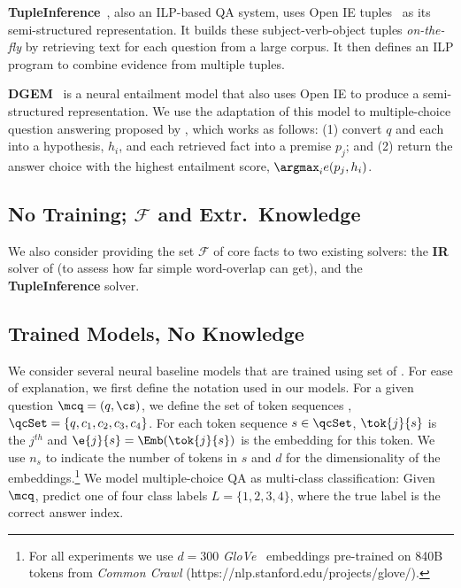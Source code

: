 \textbf{TupleInference}~\cite{Khot2017AnsweringCQ}, also an ILP-based QA system, uses Open IE tuples~\cite{Banko2007OpenIE} as its semi-structured representation. It builds these subject-verb-object tuples \emph{on-the-fly} by retrieving text for each question from a large corpus. It then defines an ILP program to combine evidence from multiple tuples.

\textbf{DGEM}~\cite{Khot2018Scitail} is a neural entailment model that also uses Open IE to produce a semi-structured representation. We use the adaptation of this model to multiple-choice question answering proposed by \citet{ARCClark2018}, which works as follows: (1) convert $q$ and each \ci into a hypothesis, $h_i$, and each retrieved fact into a premise $p_j$; and (2) return the answer choice with the highest entailment score, $\argmax_i e(p_j, h_i)$.

\subsection{No Training; $\mathcal{F}$ and Extr.~Knowledge}
\label{subsec:existing-with-core-facts}

We also consider providing the set $\mathcal{F}$ of core facts to two existing solvers: the \textbf{IR} solver of \citet{clark2016combining} (to assess how far simple word-overlap can get), and the \textbf{TupleInference} solver.

\subsection{Trained Models, No Knowledge}
\label{subsec:neural-no-external}

We consider several neural baseline models that are trained using \trainname set of \obqa. For ease of explanation, we first define the notation used in our models. For a given question $\mcq = (q, \cs)$, we define the set of token sequences , $\qcSet = \{q, c_1, c_2, c_3, c_4\}$. For each token sequence $s \in \qcSet$, $\tok{j}{s}$ is the $j^{th}$ and $\e{j}{s} = \Emb(\tok{j}{s})$ is the embedding for this token. We use $n_s$ to indicate the number of tokens in $s$ and $d$ for the dimensionality of the embeddings.\footnote{For all experiments we use $d=300$ \emph{GloVe}~\cite{Pennington2014-glove} embeddings pre-trained on 840B tokens from \textit{Common Crawl} (https://nlp.stanford.edu/projects/glove/).} We model multiple-choice QA as multi-class classification: Given $\mcq$, predict one of four class labels $L=\{1,2,3,4\}$, where the true label is the correct answer index. 

